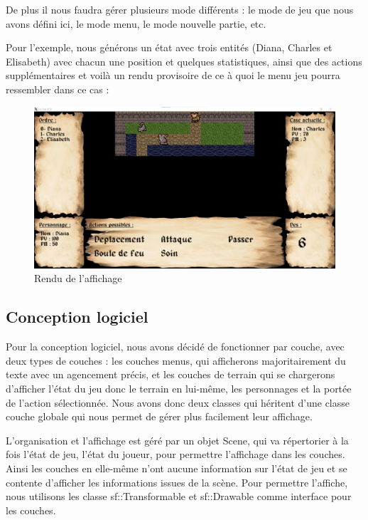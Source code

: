 \documentclass[a4paper,12pt]{article}
\begin{document}
De plus il nous faudra gérer plusieurs mode différents : le mode de jeu que nous avons défini ici, le mode menu, le mode nouvelle partie, etc.

Pour l'exemple, nous générons un état avec trois entités (Diana, Charles et Elisabeth) avec chacun une position et quelques statistiques, ainsi que des actions supplémentaires et voilà un rendu provisoire de ce à quoi le menu jeu pourra ressembler dans ce cas :
\begin{figure}[hbt!]
    \centering
    \includegraphics[width =.8\paperwidth, angle=0]{images/rendu.png}
    \caption{Rendu de l'affichage}
    \label{fig:rendu}
\end{figure}
\newpage

\subsection{Conception logiciel}

Pour la conception logiciel, nous avons décidé de fonctionner par couche, avec deux types de couches : les couches menus, qui afficherons majoritairement du texte avec un agencement précis, et les couches de terrain qui se chargerons d'afficher l'état du jeu donc le terrain en lui-même, les personnages et la portée de l'action sélectionnée. Nous avons donc deux classes qui héritent d'une classe couche globale qui nous permet de gérer plus facilement leur affichage.

L'organisation et l'affichage est géré par un objet Scene, qui va répertorier à la fois l'état de jeu, l'état du joueur, pour permettre l'affichage dans les couches. Ainsi les couches en elle-même n'ont aucune information sur l'état de jeu et se contente d'afficher les informations issues de la scène. Pour permettre l'affiche, nous utilisons les classe sf::Transformable et sf::Drawable comme interface pour les couches.
\end{document}

